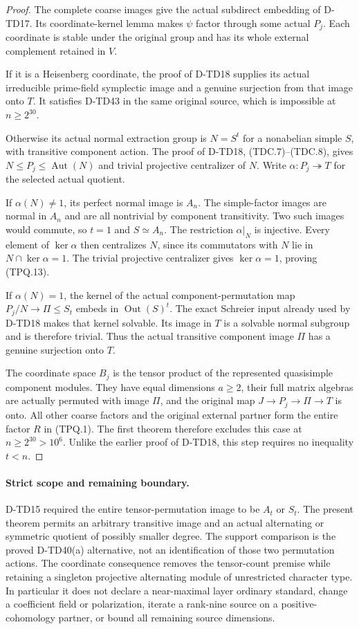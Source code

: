 \begin{proof}
The complete coarse images give the actual subdirect embedding
of D-TD17. Its coordinate-kernel lemma makes $\psi$ factor through
some actual $P_j$. Each coordinate is stable under the original
group and has its whole external complement retained in $V$.

If it is a Heisenberg coordinate, the proof of D-TD18 supplies
its actual irreducible prime-field symplectic image and a genuine
surjection from that image onto $T$. It satisfies D-TD43 in the
same original source, which is impossible at $n\ge2^{30}$.

Otherwise its actual normal extraction group is $N=S^t$ for a
nonabelian simple $S$, with transitive component action. The
proof of D-TD18, (TDC.7)--(TDC.8), gives
$N\le P_j\le\operatorname{Aut}(N)$ and trivial projective
centralizer of $N$. Write $\alpha:P_j\twoheadrightarrow T$
for the selected actual quotient.

If $\alpha(N)\ne1$, its perfect normal image is $A_n$.
The simple-factor images are normal in $A_n$ and are all nontrivial
by component transitivity. Two such images would commute, so $t=1$
and $S\simeq A_n$. The restriction $\alpha|_N$ is injective.
Every element of $\ker\alpha$ then centralizes $N$, since its
commutators with $N$ lie in $N\cap\ker\alpha=1$. The trivial
projective centralizer gives $\ker\alpha=1$, proving (TPQ.13).

If $\alpha(N)=1$, the kernel of the actual component-permutation
map $P_j/N\to\Pi\le S_t$ embeds in $\operatorname{Out}(S)^t$.
The exact Schreier input already used by D-TD18 makes that kernel
solvable. Its image in $T$ is a solvable normal subgroup and is
therefore trivial. Thus the actual transitive component image
$\Pi$ has a genuine surjection onto $T$.

The coordinate space $B_j$ is the tensor product of the represented
quasisimple component modules. They have equal dimensions $a\ge2$,
their full matrix algebras are actually permuted with image $\Pi$,
and the original map $J\to P_j\to\Pi\to T$ is onto. All other
coarse factors and the original external partner form the entire
factor $R$ in (TPQ.1). The first theorem therefore excludes this
case at $n\ge2^{30}>10^6$. Unlike the earlier proof of D-TD18,
this step requires no inequality $t<n$.
\end{proof}

\paragraph{Strict scope and remaining boundary.}
D-TD15 required the entire tensor-permutation image to be $A_t$
or $S_t$. The present theorem permits an arbitrary transitive
image and an actual alternating or symmetric quotient of possibly
smaller degree. The support comparison is the proved D-TD40(a)
alternative, not an identification of those two permutation actions.
The coordinate consequence removes the tensor-count premise while
retaining a singleton projective alternating module of unrestricted
character type. In particular it does not declare a near-maximal
layer ordinary standard, change a coefficient field or polarization,
iterate a rank-nine source on a positive-cohomology partner, or bound
all remaining source dimensions.
